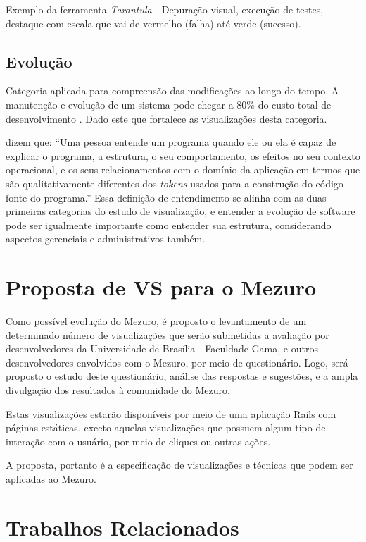 Exemplo da ferramenta \textit{Tarantula} \cite{jones2002visualization} -
Depuração visual, execução de testes, destaque com escala que vai de vermelho
(falha) até verde (sucesso).

\subsection{Evolução}

Categoria aplicada para compreensão das modificações ao longo do tempo. A
manutenção e evolução de um sistema pode chegar a 80\% do custo total de
desenvolvimento \cite{pfleeger2005analyzing}. Dado este que fortalece as
visualizações desta categoria.

 dizem que: ``Uma pessoa entende um programa
quando ele ou ela é capaz de explicar o programa, a estrutura, o seu
comportamento, os efeitos no seu contexto operacional, e os seus relacionamentos
com o domínio da aplicação em termos que são qualitativamente diferentes dos
\textit{tokens} usados para a construção do código-fonte do programa.'' Essa
definição de entendimento se alinha com as duas primeiras categorias do estudo
de visualização, e entender a evolução de software pode ser igualmente
importante como entender sua estrutura, considerando aspectos gerenciais e
administrativos também.

\section{Proposta de VS para o Mezuro}

Como possível evolução do Mezuro, é proposto o levantamento de um determinado
número de visualizações que serão submetidas a avaliação por desenvolvedores da
Universidade de Brasília - Faculdade Gama, e outros desenvolvedores envolvidos
com o Mezuro, por meio de questionário. Logo, será proposto o estudo deste
questionário, análise das respostas e sugestões, e a ampla divulgação dos
resultados à comunidade do Mezuro.

Estas visualizações estarão disponíveis por meio de uma aplicação Rails com
páginas estáticas, exceto aquelas visualizações que possuem algum tipo de
interação com o usuário, por meio de cliques ou outras ações.

A proposta, portanto é a especificação de visualizações e técnicas que podem ser
aplicadas ao Mezuro.

\section{Trabalhos Relacionados}

